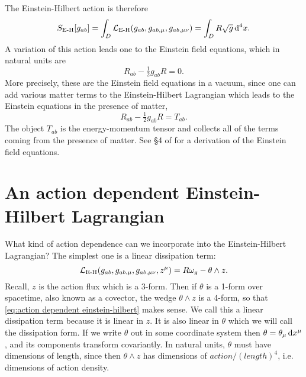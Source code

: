 \documentclass[../main.tex]{subfiles}
\begin{document}
The Einstein-Hilbert action is therefore
\begin{equation} \label{eq:EH action}
	S_{\text{E-H}}[g_{ab}] = \int_D \mathcal{L}_\text{E-H}(g_{ab}, g_{ab,\mu}, g_{ab,\mu\nu}) = \int_D R
	\sqrt{g}\,\mathrm{d}^4x.
\end{equation}
A variation of this action leads one to the Einstein field equations, which in natural
units are
\begin{equation} \label{eq:EFE vacuum}
	R_{ab} - \tfrac{1}{2}g_{ab}R = 0. 
\end{equation}
More precisely, these are the Einstein field equations in a vacuum, since one can add
various matter terms to the Einstein-Hilbert Lagrangian which leads to the Einstein
equations in the presence of matter,
\begin{equation} \label{eq:EFE matter}
	R_{ab} - \tfrac{1}{2}g_{ab}R = T_{ab}. 
\end{equation}
The object \( T_{ab} \) is the energy-momentum tensor and collects all of the terms coming
from the presence of matter. See \S4 of \cite{Carroll1997} for a derivation of the
Einstein field equations. 

\section{An action dependent Einstein-Hilbert Lagrangian}
What kind of action dependence can we incorporate into the Einstein-Hilbert Lagrangian?
The simplest one is a linear dissipation term:
\begin{equation} \label{eq:action dependent einstein-hilbert}
	\mathcal{L}_{\text{E-H}}(g_{ab}, g_{ab,\mu}, g_{ab,\mu\nu}, z^\mu) = R\omega_g - \theta \wedge z. 
\end{equation}
Recall, \( z \) is the action flux which is a 3-form. Then if \( \theta \) is a 1-form
over spacetime, also known as a covector, the wedge \( \theta \wedge z \) is a 4-form, so
that \cref{eq:action dependent einstein-hilbert} makes sense. We call this a linear
dissipation term because it is linear in \( z \). It is also linear in \( \theta \) which
we will call the dissipation form. If we write \( \theta \) out in some coordinate system
then \( \theta = \theta_\mu \,\mathrm{d} x^\mu \), and its components transform covariantly. In
natural units, \( \theta \) must have dimensions of length, since then \( \theta \wedge z
\) has dimensions of \( action/(length)^4 \), i.e. dimensions of action density. 
\end{document}

